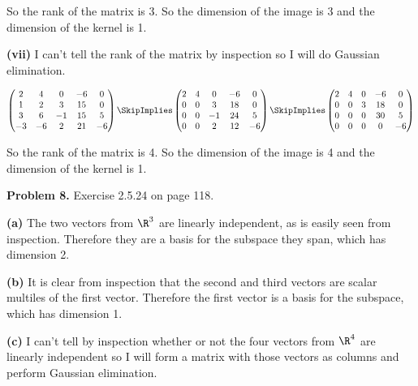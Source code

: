 \documentclass[oneside,12pt]{amsart}
\begin{document}
\bigskip

So the rank of the matrix is 3. So the dimension of the image is 3 and the
dimension of the kernel is 1.

\bigskip

\textbf{(vii)} I can't tell the rank of the matrix by inspection so I will do
Gaussian elimination.

\bigskip

$
\begin{pmatrix}
2 & 4 & 0 & -6 & 0 \\
1 & 2 & 3 & 15 & 0 \\
3 & 6 & -1 & 15 & 5 \\
-3 & -6 & 2 & 21 & -6
\end{pmatrix}
\SkipImplies
\begin{pmatrix}
2 & 4 & 0 & -6 & 0 \\
0 & 0 & 3 & 18 & 0 \\
0 & 0 & -1 & 24 & 5 \\
0 & 0 & 2 & 12 & -6
\end{pmatrix}
\SkipImplies
\begin{pmatrix}
2 & 4 & 0 & -6 & 0 \\
0 & 0 & 3 & 18 & 0 \\
0 & 0 & 0 & 30 & 5 \\
0 & 0 & 0 & 0 & -6
\end{pmatrix}
$

\bigskip

So the rank of the matrix is 4. So the dimension of the image is 4 and the
dimension of the kernel is 1.


\bigskip


\textbf{Problem 8.} Exercise 2.5.24 on page 118.

\bigskip

\textbf{(a)} The two vectors from $\R^3$ are linearly independent, as is
easily seen from inspection. Therefore they are a basis for the subspace
they span, which has dimension 2.

\bigskip

\textbf{(b)} It is clear from inspection that the second and third vectors
are scalar multiles of the first vector. Therefore the first vector is a basis
for the subspace, which has dimension 1.

\bigskip

\textbf{(c)} I can't tell by inspection whether or not the four vectors from
$\R^4$ are linearly independent so I will form a matrix with those vectors
as columns and perform Gaussian elimination.
\end{document}
